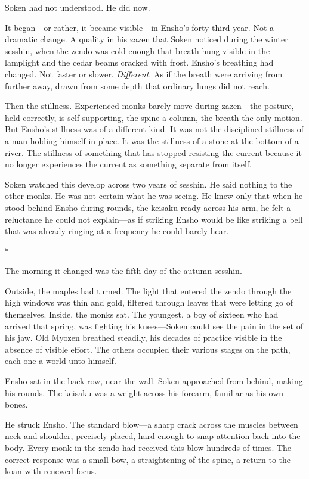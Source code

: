 Soken had not understood. He did now.

It began---or rather, it became visible---in Ensho's forty-third year. Not a dramatic change. A quality in his zazen that Soken noticed during the winter sesshin, when the zendo was cold enough that breath hung visible in the lamplight and the cedar beams cracked with frost. Ensho's breathing had changed. Not faster or slower. \emph{Different}. As if the breath were arriving from further away, drawn from some depth that ordinary lungs did not reach.

Then the stillness. Experienced monks barely move during zazen---the posture, held correctly, is self-supporting, the spine a column, the breath the only motion. But Ensho's stillness was of a different kind. It was not the disciplined stillness of a man holding himself in place. It was the stillness of a stone at the bottom of a river. The stillness of something that has stopped resisting the current because it no longer experiences the current as something separate from itself.

Soken watched this develop across two years of sesshin. He said nothing to the other monks. He was not certain what he was seeing. He knew only that when he stood behind Ensho during rounds, the keisaku ready across his arm, he felt a reluctance he could not explain---as if striking Ensho would be like striking a bell that was already ringing at a frequency he could barely hear.

\begin{center}
*\quad*\quad*
\end{center}

The morning it changed was the fifth day of the autumn sesshin.

Outside, the maples had turned. The light that entered the zendo through the high windows was thin and gold, filtered through leaves that were letting go of themselves. Inside, the monks sat. The youngest, a boy of sixteen who had arrived that spring, was fighting his knees---Soken could see the pain in the set of his jaw. Old Myozen breathed steadily, his decades of practice visible in the absence of visible effort. The others occupied their various stages on the path, each one a world unto himself.

Ensho sat in the back row, near the wall. Soken approached from behind, making his rounds. The keisaku was a weight across his forearm, familiar as his own bones.

He struck Ensho. The standard blow---a sharp crack across the muscles between neck and shoulder, precisely placed, hard enough to snap attention back into the body. Every monk in the zendo had received this blow hundreds of times. The correct response was a small bow, a straightening of the spine, a return to the koan with renewed focus.

